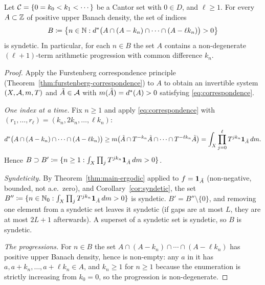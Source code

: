 \begin{theorem}
  \label{thm:main-integers}
  \leanok
  Let $\mathcal{C} = \{0 = k_0 < k_1 < \cdots\}$ be a Cantor set with $0 \in D$, and $\ell \geq 1$.
  For every $A \subset \mathbb{Z}$ of positive upper Banach density, the set of indices
  \[
    B \coloneqq \bigl\{ n \in \mathbb{N} : d^{\ast}\bigl( A \cap (A - k_n) \cap \cdots \cap (A - \ell k_n) \bigr) > 0 \bigr\}
  \]
  is syndetic.  In particular, for each $n \in B$ the set $A$ contains a non-degenerate
  $(\ell+1)$-term arithmetic progression with common difference $k_n$.
\end{theorem}

\begin{proof}
  Apply the Furstenberg correspondence principle (Theorem~\ref{thm:furstenberg-correspondence})
  to $A$ to obtain an invertible system $(X,\mathcal{A},m,T)$ and $\tilde A \in \mathcal{A}$ with
  $m(\tilde A) = d^{\ast}(A) > 0$ satisfying \eqref{eq:correspondence}.

  \emph{One index at a time.}  Fix $n \geq 1$ and apply \eqref{eq:correspondence} with
  $(r_1,\dots,r_\ell) = (k_n, 2k_n, \dots, \ell k_n)$:
  \[
    d^{\ast}\bigl(A \cap (A-k_n) \cap \cdots \cap (A-\ell k_n)\bigr)
      \geq m\bigl(\tilde A \cap T^{-k_n}\tilde A \cap \cdots \cap T^{-\ell k_n}\tilde A\bigr)
      = \int_X \prod_{j=0}^{\ell} T^{jk_n}\mathbf{1}_{\tilde A}\,dm .
  \]
  Hence $B \supset B' \coloneqq \{n \geq 1 : \int_X \prod_{j} T^{jk_n}\mathbf{1}_{\tilde A}\,dm > 0\}$.

  \emph{Syndeticity.}  By Theorem~\ref{thm:main-ergodic} applied to $f = \mathbf{1}_{\tilde A}$
  (non-negative, bounded, not a.e.\ zero), and Corollary~\ref{cor:syndetic}, the set
  $B'' \coloneqq \{n \in \mathbb{N}_0 : \int_X \prod_j T^{jk_n}\mathbf{1}_{\tilde A}\,dm > 0\}$ is syndetic.
  $B' = B'' \setminus \{0\}$, and removing one element from a syndetic set leaves it syndetic
  (if gaps are at most $L$, they are at most $2L+1$ afterwards).  A superset of a syndetic set
  is syndetic, so $B$ is syndetic.

  \emph{The progressions.}  For $n \in B$ the set $A \cap (A-k_n)\cap\cdots\cap(A-\ell k_n)$ has
  positive upper Banach density, hence is non-empty: any $a$ in it has
  $a, a+k_n, \dots, a+\ell k_n \in A$, and $k_n \geq 1$ for $n \geq 1$ because the enumeration
  is strictly increasing from $k_0 = 0$, so the progression is non-degenerate.
\end{proof}

